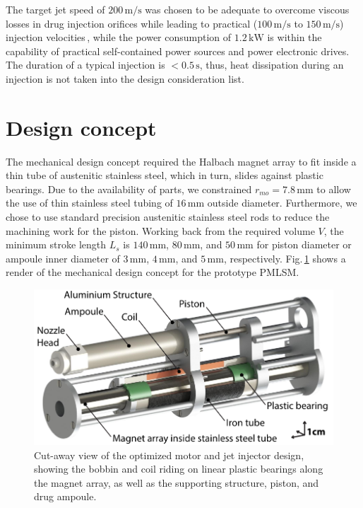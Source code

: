     
    The target jet speed of $200\,\mathrm{m/s}$ was chosen to be adequate to overcome viscous losses in drug injection orifices while leading to practical ($100\,\mathrm{m/s}$ to $150\,\mathrm{m/s}$) injection velocities\,\cite{mitragotri2006}, while the power consumption of $1.2\,\mathrm{kW}$ is within the capability of practical self-contained power sources and power electronic drives. The duration of a typical injection is $<0.5\,\mathrm{s}$, thus, heat dissipation during an injection is not taken into the design consideration list.
    

\section{Design concept}                              \label{Chapter:experiment/design concept}



    The mechanical design concept required the Halbach magnet array to fit inside a thin tube of austenitic stainless steel, which in turn, slides against plastic bearings. Due to the availability of parts, we constrained $r_{mo}=7.8\,\mathrm{mm}$ to allow the use of thin stainless steel tubing of $16\,\mathrm{mm}$ outside diameter. Furthermore, we chose to use standard precision austenitic stainless steel rods to reduce the machining work for the piston. Working back from the required volume $V$, the minimum stroke length $L_s$ is $140\,\mathrm{mm}$, $80\,\mathrm{mm}$, and $50\,\mathrm{mm}$ for piston diameter or ampoule inner diameter of $3\,\mathrm{mm}$, $4\,\mathrm{mm}$, and $5\,\mathrm{mm}$, respectively. Fig.\,\ref{fig:chap/experiment/PMLSM render} shows a render of the mechanical design concept for the prototype \acs{PMLSM}. 
    
    
    \begin{figure}[h]
        \centering
        \includegraphics[width=5in]{chap5/images/PMLSM_render.pdf}
        \caption{Cut-away view of the optimized motor and jet injector design, showing the bobbin and coil riding on linear plastic bearings along the magnet array, as well as the supporting structure, piston, and drug ampoule.}
        \label{fig:chap/experiment/PMLSM render}
    \end{figure}
    

